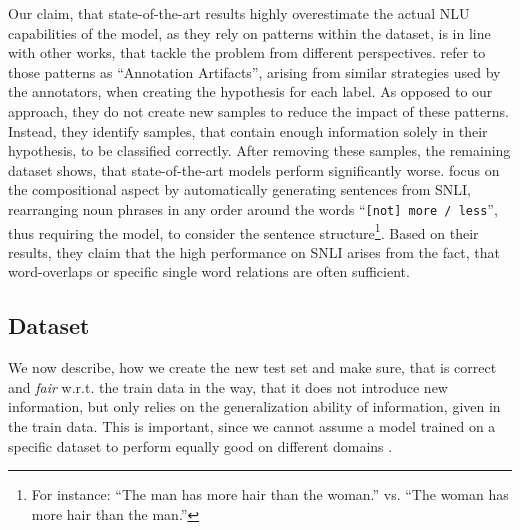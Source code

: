 Our claim, that state-of-the-art results highly overestimate the actual \ac{NLU} capabilities of the model, as they rely on patterns within the dataset, is in line with other works, that tackle the problem from different perspectives. \cite{gururangan2018annotation} refer to those patterns as ``Annotation Artifacts'', arising from similar strategies used by the annotators, when creating the hypothesis for each label. As opposed to our approach, they do not create new samples to reduce the impact of these patterns. Instead, they identify samples, that contain enough information solely in their hypothesis, to be classified correctly. After removing these samples, the remaining dataset shows, that state-of-the-art models perform significantly worse. \cite{dasgupta2018evaluating} focus on the compositional aspect by automatically generating sentences from \ac{SNLI}, rearranging noun phrases in any order around the words ``\texttt{[not] more / less}'', thus requiring the model, to consider the sentence structure\footnote{For instance: ``The man has more hair than the woman.'' vs. ``The woman has more hair than the man.''}. Based on their results, they claim that the high performance on \ac{SNLI} arises from the fact, that word-overlaps or specific single word relations are often sufficient.

\subsection{Dataset}
We now describe, how we create the new test set and make sure, that is correct and \textit{fair} w.r.t. the train data in the way, that it does not introduce new information, but only relies on the generalization ability of information, given in the train data. This is important, since we cannot assume a model trained on a specific dataset to perform equally good on different domains \citep{goldberg2017Apr}.
